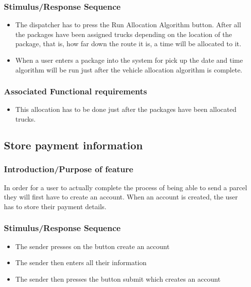 \documentclass[paper=a4, fontsize=11pt]{scrartcl} %
\numberwithin{equation}{section} %
\numberwithin{figure}{section} %
\numberwithin{table}{section} %
\begin{document}
\subsubsection{Stimulus/Response Sequence}
\begin{itemize}
			\item The dispatcher has to press the Run Allocation Algorithm button. After all the packages have been assigned trucks depending on the location of the package, that is, how far down the route it is, a time will be allocated to it.  
			\item When a user enters a package into the system for pick up the date and time algorithm will be run just after the vehicle allocation algorithm is complete.
\end{itemize}
	 

\subsubsection{Associated Functional requirements}

\begin{itemize}
			\item This allocation has to be done just after the packages have been allocated trucks. 
\end{itemize}

	

\subsection{Store payment information}
\subsubsection{Introduction/Purpose of feature}
In order for a user to actually complete the process of being able to send a parcel they will first have to create an account. When an account is created, the user has to store their payment details.
\subsubsection{Stimulus/Response Sequence}
\begin{itemize}
			\item The sender presses on the button create an account 
			\item The sender then enters all their information 
			\item The sender then presses the button submit which creates an account 
\end{itemize}
	
\end{document}
